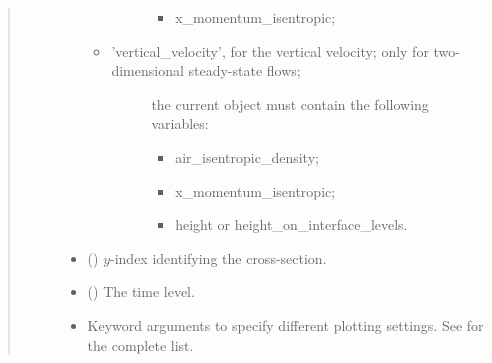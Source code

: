 \documentclass[letterpaper,10pt,english]{sphinxmanual}
\begin{document}
\begin{fulllineitems}
\begin{fulllineitems}
\begin{quote}
\begin{description}
\begin{itemize}
\begin{itemize}
\begin{description}
\begin{itemize}
\item {} 
x\_momentum\_isentropic;

\end{itemize}

\end{description}

\item {} \begin{description}
\item[{’vertical\_velocity’, for the vertical velocity; only for two-dimensional steady-state flows;}] \leavevmode
the current object must contain the following variables:
\begin{itemize}
\item {} 
air\_isentropic\_density;

\item {} 
x\_momentum\_isentropic;

\item {} 
height or height\_on\_interface\_levels.

\end{itemize}

\end{description}

\end{itemize}


\item {} 
 () \textendash{} \(y\)-index identifying the cross-section.

\item {} 
 () \textendash{} The time level.

\item {} 
 \textendash{} Keyword arguments to specify different plotting settings.
See {\hyperref[\detokenize{api:tasmania.utils.utils_plot.contour_xz}]{}} for the complete list.

\end{itemize}

\end{description}\end{quote}

\end{fulllineitems}



\end{fulllineitems}
\end{document}
